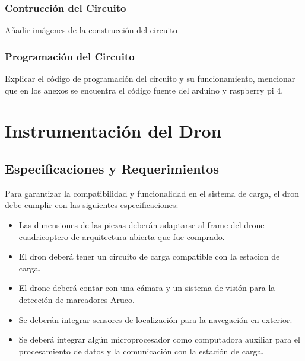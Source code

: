     \subsubsection{Contrucción del Circuito}
    Añadir imágenes de la construcción del circuito

    \subsubsection{Programación del Circuito}
    Explicar el código de programación del circuito y su funcionamiento, mencionar que en los anexos se encuentra el código fuente del arduino y raspberry pi 4.


\section{Instrumentación del Dron}

\subsection{Especificaciones y Requerimientos}
Para garantizar la compatibilidad y funcionalidad en el sistema de carga, el dron debe cumplir con las siguientes especificaciones:
    \begin{itemize}
        \item Las dimensiones de las piezas deberán adaptarse al frame del drone cuadricoptero de arquitectura abierta que fue comprado.
        \item El dron deberá tener un circuito de carga compatible con la estacion de carga.
        \item El drone deberá contar con una cámara y un sistema de visión para la detección de marcadores Aruco.
        \item Se deberán integrar sensores de localización para la navegación en exterior.
        \item Se deberá integrar algún microprocesador como computadora auxiliar para el procesamiento de datos y la comunicación con la estación de carga.
    \end{itemize}

